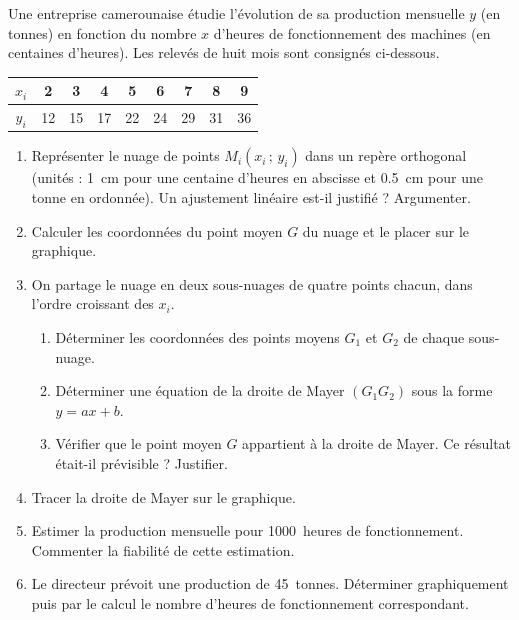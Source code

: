 \documentclass[11pt]{article}
\begin{document}
\begin{exercice}
Une entreprise camerounaise étudie l'évolution de sa production mensuelle $y$ (en tonnes) en fonction du nombre $x$ d'heures de fonctionnement des machines (en centaines d'heures). Les relevés de huit mois sont consignés ci-dessous.

\begin{center}
\begin{tabular}{|c|c|c|c|c|c|c|c|c|}
\hline
$x_i$ & 2 & 3 & 4 & 5 & 6 & 7 & 8 & 9 \\
\hline
$y_i$ & 12 & 15 & 17 & 22 & 24 & 29 & 31 & 36 \\
\hline
\end{tabular}
\end{center}

\begin{enumerate}
\item Représenter le nuage de points $M_i(x_i\,;\,y_i)$ dans un repère orthogonal (unités : \SI{1}{\centi\meter} pour une centaine d'heures en abscisse et \SI{0,5}{\centi\meter} pour une tonne en ordonnée). Un ajustement linéaire est-il justifié ? Argumenter.
\item Calculer les coordonnées du point moyen $G$ du nuage et le placer sur le graphique.
\item On partage le nuage en deux sous-nuages de quatre points chacun, dans l'ordre croissant des $x_i$.
\begin{enumerate}
\item Déterminer les coordonnées des points moyens $G_1$ et $G_2$ de chaque sous-nuage.
\item Déterminer une équation de la droite de Mayer $(G_1G_2)$ sous la forme $y = ax + b$.
\item Vérifier que le point moyen $G$ appartient à la droite de Mayer. Ce résultat était-il prévisible ? Justifier.
\end{enumerate}
\item Tracer la droite de Mayer sur le graphique.
\item Estimer la production mensuelle pour \SI{1000}{heures} de fonctionnement. Commenter la fiabilité de cette estimation.
\item Le directeur prévoit une production de \SI{45}{tonnes}. Déterminer graphiquement puis par le calcul le nombre d'heures de fonctionnement correspondant.
\end{enumerate}
\end{exercice}
\end{document}
